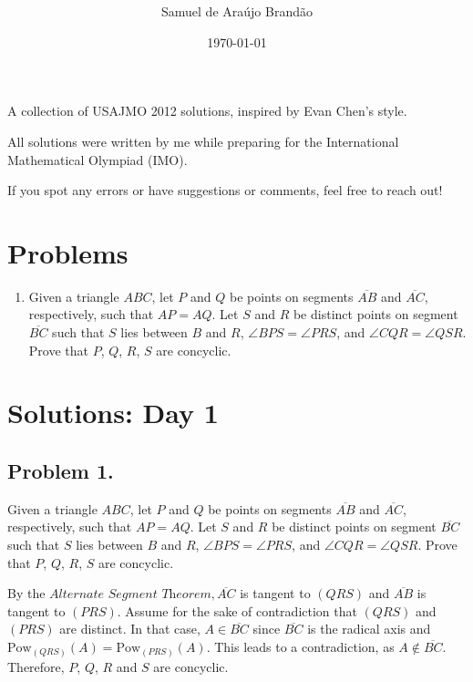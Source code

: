 \documentclass[12pt]{article}
\title{\bfseries\sffamily{USAJMO 2012 Solutions}}
\author{Samuel de Araújo Brandão}
\date{\today}
\begin{document}
  \maketitle
  A collection of USAJMO 2012 solutions, inspired by Evan Chen’s style.

  All solutions were written by me while preparing for the International Mathematical Olympiad (IMO).

  If you spot any errors or have suggestions or comments, feel free to reach out!
  \tableofcontents
  \clearpage

  \section{\textsf{Problems}}
  \begin{enumerate}[label=\textbf{\arabic*.}]
    \item Given a triangle $ABC$, let $P$ and $Q$ be points on segments $\overline{AB}$ and $\overline{AC}$,
    respectively, such that $AP = AQ$. Let $S$ and $R$ be distinct points on segment $\overline{BC}$
    such that $S$ lies between $B$ and $R$, $\angle BPS = \angle PRS$, and $\angle CQR = \angle QSR$.
    Prove that $P$, $Q$, $R$, $S$ are concyclic.

  \end{enumerate}

  \clearpage

  \section{\textsf{Solutions: Day 1}}
    \subsection{Problem 1.}

      \begin{tcolorbox}[problembox=Problem statement]
        Given a triangle $ABC$, let $P$ and $Q$ be points on segments $\overline{AB}$ and $\overline{AC}$,
        respectively, such that $AP = AQ$. Let $S$ and $R$ be distinct points on segment $\overline{BC}$
        such that $S$ lies between $B$ and $R$, $\angle BPS = \angle PRS$, and $\angle CQR = \angle QSR$.
        Prove that $P$, $Q$, $R$, $S$ are concyclic.
      \end{tcolorbox}
      By the $\textit{Alternate Segment Theorem}, \overline{AC}$ is tangent to $(QRS)$ and $\overline{AB}$
      is tangent to $(PRS)$. Assume for the sake of contradiction that $(QRS)$ and $(PRS)$ are distinct. In that case,
      $A \in \overline{BC}$ since $\overline{BC}$ is the radical axis and $\text{Pow}_{(QRS)}(A) =
      \text{Pow}_{(PRS)}(A)$. This leads to a contradiction, as $A \notin \overline{BC}$. Therefore,
      $P$, $Q$, $R$ and $S$ are concyclic.
\end{document}
